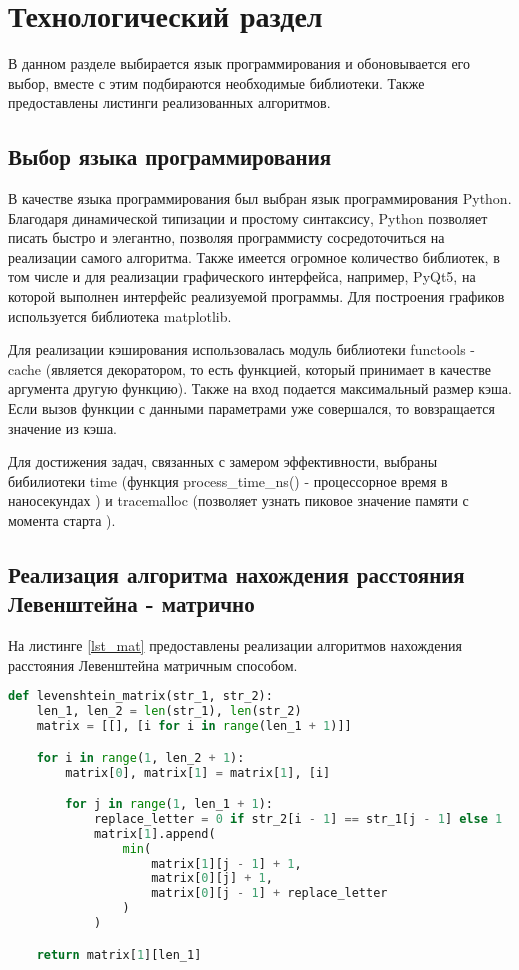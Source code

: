 \chapter{Технологический раздел}
В данном разделе выбирается язык программирования и обоновывается его выбор, вместе с этим подбираются необходимые библиотеки. Также предоставлены листинги реализованных алгоритмов.

\section{Выбор языка программирования}
В качестве языка программирования был выбран язык программирования Python. Благодаря динамической типизации и простому синтаксису, Python позволяет писать быстро и элегантно, позволяя программисту сосредоточиться на реализации самого алгоритма. Также имеется огромное количество библиотек, в том числе и для реализации графического интерфейса, например, PyQt5, на которой выполнен интерфейс реализуемой программы. Для построения графиков используется библиотека matplotlib.

Для реализации кэширования использовалась модуль библиотеки functools - cache (является декоратором, то есть функцией, который принимает в качестве аргумента другую функцию). Также на вход подается максимальный размер кэша. Если вызов функции с данными параметрами уже совершался, то вовзращается значение из кэша. \cite{cache}

Для достижения задач, связанных с замером эффективности, выбраны бибилиотеки time (функция process\_time\_ns() - процессорное время в наносекундах \cite{process_time}) и tracemalloc (позволяет узнать пиковое значение памяти с момента старта \cite{tracemalloc}).

\section{Реализация алгоритма нахождения расстояния Левенштейна - матрично}
На листинге \ref{lst_mat} предоставлены реализации алгоритмов нахождения расстояния Левенштейна матричным способом.
\begin{lstlisting}[language=Python, caption=Реализация алгоритма Левенштейна матричным способом, label=lst_mat]
def levenshtein_matrix(str_1, str_2):
	len_1, len_2 = len(str_1), len(str_2)
	matrix = [[], [i for i in range(len_1 + 1)]]

	for i in range(1, len_2 + 1):
		matrix[0], matrix[1] = matrix[1], [i]

		for j in range(1, len_1 + 1):
			replace_letter = 0 if str_2[i - 1] == str_1[j - 1] else 1
			matrix[1].append(
				min(
					matrix[1][j - 1] + 1,
					matrix[0][j] + 1,
					matrix[0][j - 1] + replace_letter
				)
			)

	return matrix[1][len_1]
\end{lstlisting}

